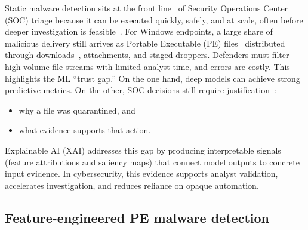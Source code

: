 \documentclass[conference]{IEEEtran}
\begin{document}
Static malware detection sits at the front line~\cite{KBSSSK2025} of Security Operations Center (SOC) triage because it can be executed quickly, safely, and at scale, often before deeper investigation is feasible~\cite{GPH2024}.
For Windows endpoints, a large share of malicious delivery still arrives as Portable Executable (PE) files~\cite{opentext2025} distributed through downloads~\cite{recordedfuture2025malware}, attachments, and staged droppers.
Defenders must filter high-volume file streams with limited analyst time, and errors are costly.
This highlights the ML ``trust gap.''
On the one hand, deep models can achieve strong predictive metrics.
On the other, SOC decisions still require justification~\cite{NSDSP2025}: 
\begin{itemize}
 \item 
 why a file was quarantined, and 
 \item 
 what evidence supports that action.
\end{itemize}



Explainable AI (XAI) addresses this gap by producing interpretable signals (feature attributions and saliency maps) that connect model outputs to concrete input evidence.
In cybersecurity, this evidence supports analyst validation, accelerates investigation, and reduces reliance on opaque automation.

\subsection{Feature-engineered PE malware detection} %
\end{document}
